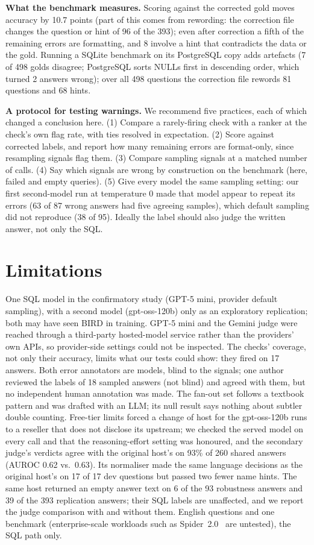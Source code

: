 \documentclass[conference]{IEEEtran}
\begin{document}
\textbf{What the benchmark measures.} Scoring against the corrected gold moves accuracy by 10.7
points (part of this comes from rewording: the correction file changes the question or hint of 96 of
the 393); even after
correction a fifth of the remaining errors are formatting, and 8 involve a hint that contradicts the
data or the gold. Running a SQLite benchmark on its PostgreSQL copy adds artefacts (7 of 498 golds
disagree; PostgreSQL sorts NULLs first in descending order, which turned 2 answers wrong); over all
498 questions the correction file rewords 81 questions and 68 hints. 

\textbf{A protocol for testing warnings.} We recommend five practices, each of which changed a
conclusion here. (1) Compare a rarely-firing check with a ranker at the check's own flag rate, with
ties resolved in expectation. (2) Score against corrected labels, and report how many remaining errors
are format-only, since resampling signals flag them. (3) Compare sampling signals at a matched number
of calls. (4) Say which signals are wrong by construction on the benchmark (here, failed and empty
queries). (5) Give every model the same sampling setting: our first second-model run at temperature 0
made that model appear to repeat its errors (63 of 87 wrong answers had five agreeing samples), which
default sampling did not reproduce (38 of 95). Ideally the label should also judge the written answer,
not only the SQL.

\section{Limitations}

One SQL model in the confirmatory study (GPT-5 mini, provider default sampling), with a second model
(gpt-oss-120b) only as an exploratory replication; both may have seen BIRD in training. GPT-5 mini and
the Gemini judge were reached through a third-party hosted-model service rather than the providers' own
APIs, so provider-side settings could not be inspected. The checks' coverage, not only their accuracy,
limits what our tests could show: they fired on 17 answers. Both error annotators are models, blind to the signals; one author reviewed the labels of 18 sampled
answers (not blind) and agreed with them, but no independent human annotation was made. The fan-out set follows a textbook pattern and was drafted with an LLM; its null result
says nothing about subtler double counting. Free-tier limits forced a change of host for the
gpt-oss-120b runs to a reseller that does not disclose its upstream; we checked the served model on
every call and that the reasoning-effort setting was honoured, and the secondary judge's verdicts
agree with the original host's on 93\% of 260 shared answers (AUROC 0.62 vs.\ 0.63). Its normaliser made the same language decisions as the original host's on 17 of 17 dev questions but passed two
fewer name hints. The same host returned an empty answer text on 6 of the 93 robustness answers and 39 of the 393 replication answers; their SQL labels are unaffected, and
we report the judge comparison with and without them. English questions and one benchmark (enterprise-scale workloads such as Spider~2.0~\cite{lei2025spider2} are untested), the SQL path
only.
\end{document}
